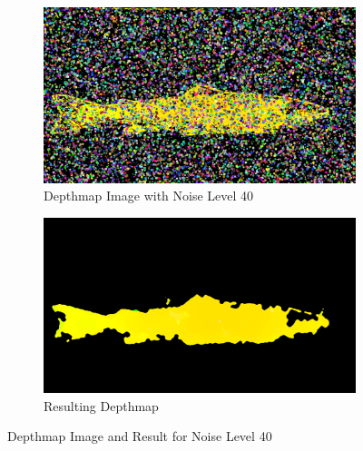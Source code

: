 \begin{figure}[H]
    \centering
    \begin{subfigure}{0.5\textwidth}
        \centering
        \includegraphics[width=.95\linewidth]{images/results/noise/noise63_40}
        \caption{Depthmap Image with Noise Level 40} 
        \label{fig:image_noise_level_40}
    \end{subfigure}%
    \begin{subfigure}{0.5\textwidth}
        \centering
        \includegraphics[width=.95\linewidth]{images/results/noise/filternoise63_40}
        \caption{Resulting Depthmap} 
        \label{fig:filter_noise_level_40}
    \end{subfigure}
    \caption{Depthmap Image and Result for Noise Level 40}
    \label{fig:noise_level_40}
\end{figure}

